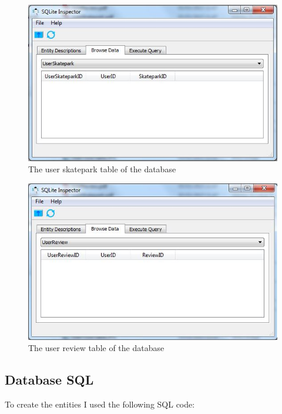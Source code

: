 \begin{figure}[H]
    \includegraphics[width=\textwidth]{./Maintenance/Figures/UserSkateparkTable.jpg}
    \caption{The user skatepark table of the database} \label{fig:UserSkatepark Table}
\end{figure}

\begin{figure}[H]
    \includegraphics[width=\textwidth]{./Maintenance/Figures/UserReviewTable.jpg}
    \caption{The user review table of the database} \label{fig:UserReview Table}
\end{figure}


\subsection{Database SQL}

To create the entities I used the following SQL code:


